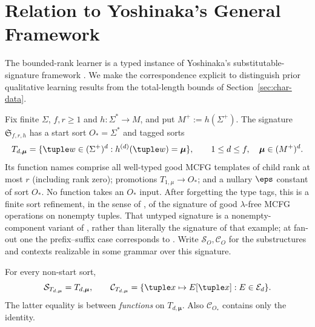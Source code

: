 
\section{Relation to Yoshinaka's General Framework}
\label{sec:general-framework}

The bounded-rank learner is a typed instance of
Yoshinaka's substitutable-signature framework
\cite{Yoshinaka2015General}. We make the
correspondence explicit to distinguish prior
qualitative learning results from the total-length
bounds of Section~\ref{sec:char-data}.

Fix finite $\Sigma$, $f,r\ge1$ and
$h:\Sigma^*\to M$, and put $M^+:=h(\Sigma^+)$.
The signature $\mathfrak S_{f,r,h}$ has a
start sort $O_*=\Sigma^*$ and tagged sorts
\[
 T_{d,\boldsymbol\mu}
 =\{\tuple w\in(\Sigma^+)^d:
 h^{(d)}(\tuple w)=\boldsymbol\mu\},
 \qquad
 1\le d\le f,\quad\boldsymbol\mu\in(M^+)^d.
\]
Its function names comprise all well-typed
good MCFG templates of child rank at most $r$
(including rank zero); promotions
$T_{1,\mu}\to O_*$; and a nullary $\eps$
constant of sort $O_*$. No function takes an
$O_*$ input. After forgetting the type tags, this is a
finite sort refinement, in the sense of
\cite[Section~8]{Yoshinaka2015General}, of
the signature of good $\lambda$-free MCFG
operations on nonempty tuples. That
untyped signature is a nonempty-component
variant of \cite[Example~3]{Yoshinaka2015General},
rather than literally the signature of that
example; at fan-out one the prefix--suffix
case corresponds to
\cite[Example~4]{Yoshinaka2015General}.
Write $\mathcal S_O,\mathcal C_O$ for the
substructures and contexts realizable in
some grammar over this signature.

\begin{lemma}
\label{lem:signature-contexts}
For every non-start sort,
\[
 \mathcal S_{T_{d,\boldsymbol\mu}}
 =T_{d,\boldsymbol\mu},
 \qquad
 \mathcal C_{T_{d,\boldsymbol\mu}}
 =\{\tuple x\mapsto E[\tuple x]:E\in\mathcal E_d\}.
\]
The latter equality is between \emph{functions}
on $T_{d,\boldsymbol\mu}$.
Also $\mathcal C_{O_*}$ contains only the identity.
\end{lemma}

